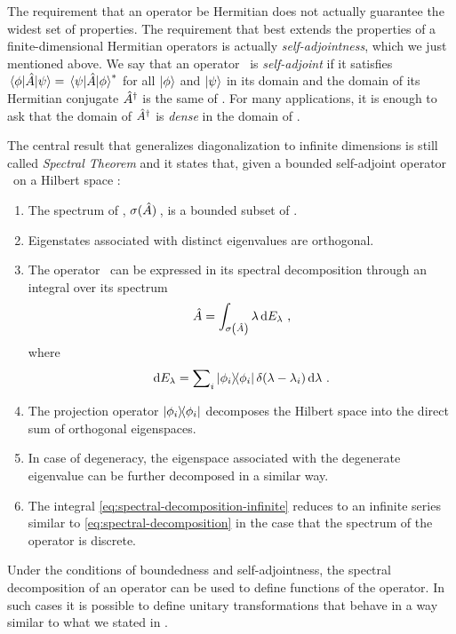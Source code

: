             The requirement that an operator be Hermitian does not actually guarantee the widest set of properties. The requirement that best extends the properties of a finite-dimensional Hermitian operators is actually \emph{self-adjointness}, which we just mentioned above. We say that an operator \hA\ is \emph{self-adjoint} if it satisfies $\mel{\phi}{\ensuremath{\hat{A}}}{\psi} = \mel{\psi}{\ensuremath{\hat{A}}}{\phi}^*$ for all $\ket{\phi}$ and $\ket{\psi}$ in its domain and the domain of its Hermitian conjugate $\hat{A}^\dag$ is the same of \hA. For many applications, it is enough to ask that the domain of $\hat{A}^\dag$ is \emph{dense} in the domain of \hA.

            The central result that generalizes diagonalization to infinite dimensions is still called \emph{Spectral Theorem} and it states that, given a bounded self-adjoint operator \hA\ on a Hilbert space \cite{Bernardini1993-iy}:
            \begin{enumerate}[label = \textit{\roman{enumi}}.]
                \item The spectrum of \hA, $\sigma\pqty*{\hA}$, is a bounded subset of \bbR.
                \item Eigenstates associated with distinct eigenvalues are orthogonal. \label{p:orthogonality}
                \item The operator \hA\ can be expressed in its spectral decomposition through an integral over its spectrum
                    \begin{equation}
                        \label{eq:spectral-decomposition-infinite}
                        \hA = \int\nolimits_{\sigma\pqty{\hA}} \lambda \dd{E_\lambda}
                        \mycomma
                    \end{equation}
                    where
                    \begin{equation*}
                        \dd{E_\lambda} = \sum\nolimits_i \dyad{\phi_i}{\phi_i}\delta\pqty{\lambda - \lambda_i}\dd{\lambda}
                        \myperiod
                    \end{equation*}
                \item The projection operator $\dyad{\phi_i}{\phi_i}$ decomposes the Hilbert space into the direct sum of orthogonal eigenspaces.
                \item In case of degeneracy, the eigenspace associated with the degenerate eigenvalue can be further decomposed in a similar way.
                \item The integral \eqref{eq:spectral-decomposition-infinite} reduces to an infinite series similar to \eqref{eq:spectral-decomposition} in the case that the spectrum of the operator is discrete.
            \end{enumerate}

            Under the conditions of boundedness and self-adjointness, the spectral decomposition of an operator can be used to define functions of the operator. In such cases it is possible to define unitary transformations that behave in a way similar to what we stated in .